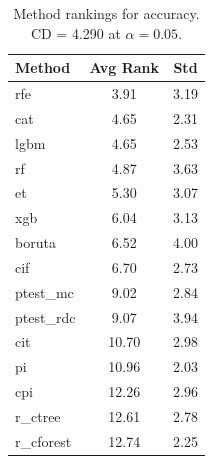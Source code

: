 \begin{table}[h]
\centering
\caption{Method rankings for accuracy. CD = 4.290 at $\alpha=0.05$.}
\label{tab:ranks_accuracy}
\begin{tabular}{lcc}
\toprule
Method & Avg Rank & Std \\
\midrule
rfe & 3.91 & 3.19 \\
cat & 4.65 & 2.31 \\
lgbm & 4.65 & 2.53 \\
rf & 4.87 & 3.63 \\
et & 5.30 & 3.07 \\
xgb & 6.04 & 3.13 \\
boruta & 6.52 & 4.00 \\
cif & 6.70 & 2.73 \\
ptest_mc & 9.02 & 2.84 \\
ptest_rdc & 9.07 & 3.94 \\
cit & 10.70 & 2.98 \\
pi & 10.96 & 2.03 \\
cpi & 12.26 & 2.96 \\
r_ctree & 12.61 & 2.78 \\
r_cforest & 12.74 & 2.25 \\
\bottomrule
\end{tabular}
\end{table}